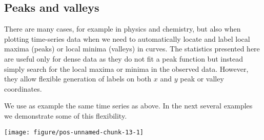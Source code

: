 \documentclass[paper=a4,10pt,div=17,headsepline,BCOR=12mm,twoside,open=right]{scrbook}\usepackage{knitr}
\begin{document}
\subsection{Peaks and valleys}

There are many cases, for example in physics and chemistry, but also when plotting time-series data when we need to automatically locate and label local maxima (peaks) or local minima (valleys) in curves. The statistics presented here are useful only for dense data as they do not fit a peak function but instead simply search for the local maxima or minima in the observed data. However, they allow flexible generation of labels on both $x$ and $y$ peak or valley coordinates.

We use as example the same time series as above. In the next several examples we demonstrate some of this flexibility.

\begin{knitrout}\footnotesize
{}\color{fgcolor}\begin{kframe}
\begin{alltt}
 \hlkwb{<-} \hlstd{(} \hlstd{=} \hlstd{(}  \hlstd{=} 
\end{alltt}
\end{kframe}
\end{knitrout}

\begin{knitrout}\footnotesize
{}\color{fgcolor}

{\centering \texttt{[image: figure/pos-unnamed-chunk-13-1]} 

}



\end{knitrout}
\end{document}
